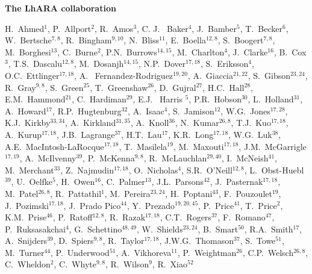 \vspace{0.75cm}
\begin{center}
  {\bf \color{BlueViolet} The LhARA collaboration} \\
  \vspace{0.25cm}
\end{center}
\begin{center}
  H.~Ahmed$^{1}$,
  P.~Allport$^{2}$,
  R.~Amos$^{3}$,
  C. J. ~Baker$^{4}$,
  J.~Bamber$^{5}$,
  T.~Becker$^{6}$,
  W.~Bertsche$^{7,8}$,
  R.~Bingham$^{9,10}$,
  N.~Bliss$^{11}$,
  E.~Boella$^{12,8}$,
  S.~Boogert$^{7,8}$,
  M.~Borghesi$^{13}$,
  C.~Burne$^{2}$,
  P.N.~Burrows$^{14,15}$,
  M.~Charlton$^{4}$,
  J.~Clarke$^{16}$,
  B.~Cox$^{3}$,
  T.S.~Dascalu$^{12,8}$,
  M.~Dosanjh$^{14,15}$,
  N.P.~Dover$^{17,18}$,
  S.~Eriksson$^{4}$,
  O.C.~Ettlinger$^{17,18}$,
  A. ~Fernandez-Rodriguez$^{19,20}$,
  A.~Giaccia$^{21,22}$,
  S.~Gibson$^{23,24}$,
  R.~Gray$^{9,8}$,
  S.~Green$^{25}$,
  T.~Greenshaw$^{26}$,
  D.~Gujral$^{27}$,
  H.C.~Hall$^{28}$,
  E.M.~Hammond$^{21}$,
  C.~Hardiman$^{29}$,
  E.J. ~Harris $^{5}$,
  P.R.~Hobson$^{30}$,
  L.~Holland$^{31}$,
  A.~Howard$^{17}$,
  R.P.~Hugtenburg$^{32}$,
  A.~Isaac$^{4}$,
  S.~Jamison$^{12}$,
  W.G.~Jones$^{17,28}$,
  K.J.~Kirkby$^{33,34}$,
  A.~Kirkland$^{31,35}$,
  A.~Knoll$^{36}$,
  N.~Kumar$^{26,8}$,
  T.J.~Kuo$^{17,18}$,
  A.~Kurup$^{17,18}$,
  J.B.~Lagrange$^{37}$,
  H.T.~Lau$^{17}$,
  K.R.~Long$^{17,18}$,
  W.G.~Luk$^{38}$,
  A.E.~MacIntosh-LaRocque$^{17,18}$,
  T.~Masilela$^{19}$,
  M.~Maxouti$^{17,18}$,
  J.M.~McGarrigle$^{17,19}$,
  A.~McIlvenny$^{39}$,
  P.~McKenna$^{9,8}$,
  R.~McLauchlan$^{29,40}$,
  I.~McNeish$^{41}$,
  M.~Merchant$^{33}$,
  Z.~Najmudin$^{17,18}$,
  O.~Nicholas$^{4}$,
  S.R.~O'Neill$^{12,8}$,
  L.~Obst-Huebl$^{39}$,
  U.~Oelfke$^{5}$,
  H.~Owen$^{16}$,
  C.~Palmer$^{13}$,
  J.L.~Parsons$^{42}$,
  J.~Pasternak$^{17,18}$,
  M.~Patel$^{26,8}$,
  R.~Pattathil$^{1}$,
  M.~Pereira$^{23,24}$,
  H.~Poptani$^{43}$,
  F.~Pouzoulet$^{19}$,
  J.~Pozimski$^{17,18}$,
  J.~Prado Pico$^{44}$,
  Y.~Prezado$^{19,20,45}$,
  P.~Price$^{41}$,
  T.~Price$^{2}$,
  K.M.~Prise$^{46}$,
  P.~Ratoff$^{12,8}$,
  R.~Razak$^{17,18}$,
  C.T.~Rogers$^{37}$,
  F.~Romano$^{47}$,
  P.~Ruksasakchai$^{4}$,
  G.~Schettino$^{48,49}$,
  W.~Shields$^{23,24}$,
  B.~Smart$^{50}$,
  R.A.~Smith$^{17}$,
  A.~Snijders$^{39}$,
  D.~Spiers$^{9,8}$,
  R.~Taylor$^{17,18}$,
  J.W.G.~Thomason$^{37}$,
  S.~Towe$^{51}$,
  M.~Turner$^{44}$,
  P.~Underwood$^{51}$,
  A.~Vikhoreva$^{11}$,
  P.~Weightman$^{26}$,
  C.P.~Welsch$^{26,8}$,
  C.~Wheldon$^{2}$,
  C.~Whyte$^{9,8}$,
  R.~Wilson$^{9}$,
  R.~Xiao$^{52}$
\end{center}
